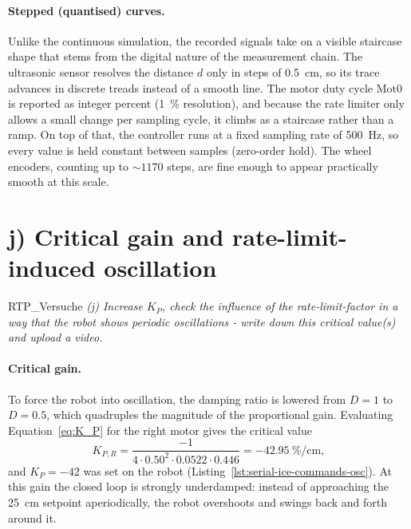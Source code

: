 \documentclass[12pt, oneside, a4paper]{scrreprt}
\begin{document}
            \paragraph{Stepped (quantised) curves.}
                Unlike the continuous simulation, the recorded signals take on a visible staircase shape that stems from the digital nature of the measurement chain. The ultrasonic sensor resolves the distance $d$ only in steps of \qty{0.5}{\cm}, so its trace advances in discrete treads instead of a smooth line. The motor duty cycle $\mathrm{Mot0}$ is reported as integer percent (\qty{1}{\percent} resolution), and because the rate limiter only allows a small change per sampling cycle, it climbs as a staircase rather than a ramp. On top of that, the controller runs at a fixed sampling rate of \qty{500}{\hertz}, so every value is held constant between samples (zero-order hold). The wheel encoders, counting up to ${\sim}1170$ steps, are fine enough to appear practically smooth at this scale.

        \section{j) Critical gain and rate-limit-induced oscillation}\label{sec:j-}

            \begin{displaycquote}{RTP_Versuche}
                \footnotesize{\textit{(j) Increase $K_P$, check the influence of the rate-limit-factor in a way that the robot shows periodic oscillations - write down this critical value(s) and upload a video.}}
            \end{displaycquote}\label{task(j)}


            \paragraph{Critical gain.}
                To force the robot into oscillation, the damping ratio is lowered from $D=1$ to $D=0.5$, which quadruples the magnitude of the proportional gain. Evaluating Equation~\ref{eq:K_P} for the right motor gives the critical value
                \begin{equation}
                    K_{P,R} = \frac{-1}{4 \cdot 0.50^2 \cdot 0.0522 \cdot 0.446} = \qty{-42.95}{\percent\per\cm},
                \end{equation}
                and $K_P = -42$ was set on the robot (Listing~\ref{lst:serial-ice-commands-osc}). At this gain the closed loop is strongly underdamped: instead of approaching the \qty{25}{\cm} setpoint aperiodically, the robot overshoots and swings back and forth around it.
\end{document}
